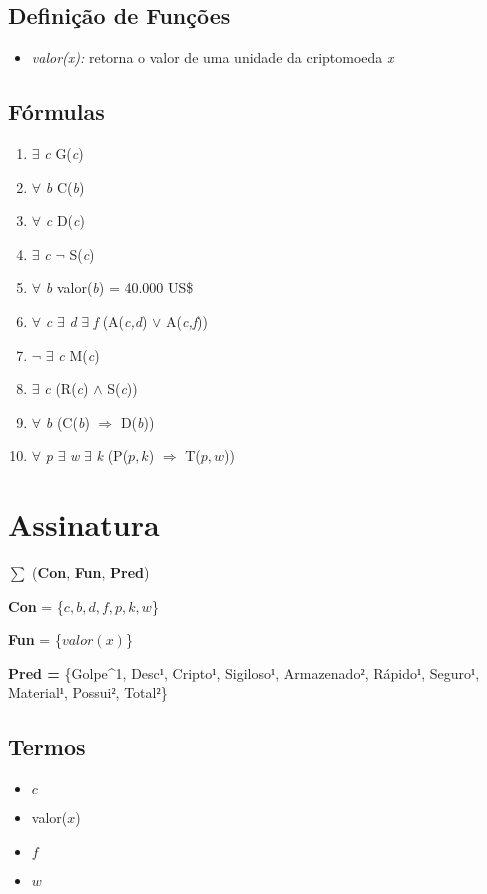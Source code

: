 \documentclass{article}
\begin{document}
\subsection{Definição de Funções}
\begin{itemize}
    \item \emph{valor(x):} retorna o valor de uma unidade da criptomoeda \emph{x}
\end{itemize}

\subsection{Fórmulas}

\begin{enumerate}
    \item $\exists$ \emph{c} G(\emph{c})
    \item $\forall$ \emph{b} C(\emph{b})
    \item $\forall$ \emph{c} D(\emph{c})
    \item $\exists$ \emph{c} $\neg$ S(\emph{c})
    \item $\forall$ \emph{b} valor(\emph{b}) = 40.000 US\$
    \item $\forall$ \emph{c} $\exists$ \emph{d} $\exists$ \emph{f} (A(\emph{c,d}) $\lor$ A(\emph{c,f}))
    \item $\neg$ $\exists$ \emph{c} M(\emph{c})
    \item $\exists$ \emph{c} (R(\emph{c}) $\land$ S(\emph{c}))
    \item $\forall$ \emph{b} (C(\emph{b}) $\Rightarrow$ D(\emph{b}))
    \item $\forall$ \emph{p} $\exists$ \emph{w} $\exists$ \emph{k} (P(\emph{$p,k$}) $\Rightarrow$ T($p,w$))
\end{enumerate}
\section{Assinatura}
$\sum$ ({\bf Con}, {\bf Fun}, {\bf Pred})

{\bf Con} = \{$c,b,d,f,p,k,w$\}

{\bf Fun} = \{$valor(x)$\}

{\bf Pred = }\{Golpe^{1}, Desc$¹$, Cripto$¹$, Sigiloso$¹$, Armazenado$²$, Rápido$¹$, Seguro$¹$, Material$¹$, Possui$²$, Total$²$\}

\subsection{Termos}
\begin{itemize}
    \item $c$
    \item valor($x$)
    \item $f$
    \item $w$
\end{itemize}
\end{document}
